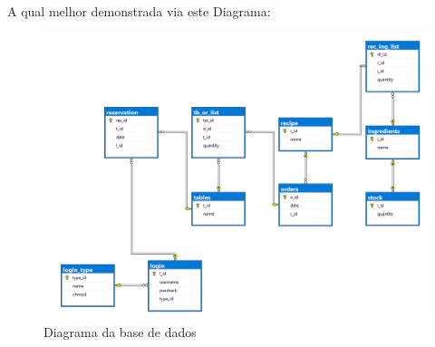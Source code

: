 A qual melhor demonstrada via este Diagrama:

\begin{figure}[!hbt]
    \centering
    \includegraphics[width=14cm]{Resources/Database/DB (1).png}
    \caption{Diagrama da base de dados}
    
\end{figure}